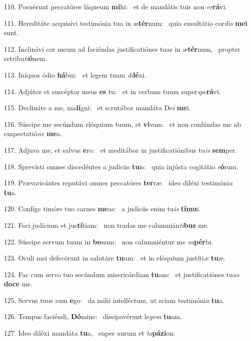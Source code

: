 110. Posuérunt peccatóres láqueum \textbf{mi}hi: \ast\  et de mandátis tuis non \textit{er}\textbf{rá}vi.\

111. Hereditáte acquisívi testimónia tua in æ\textbf{tér}num: \ast\  quia exsultátio cor\textit{dis} \textbf{me}\textbf{i} sunt.\

112. Inclinávi cor meum ad faciéndas justificatiónes tuas in æ\textbf{tér}num, \ast\  propter retribu\textit{ti}\textbf{ó}nem.\

113. Iníquos ódio \textbf{há}bui: \ast\  et legem tuam \textit{di}\textbf{lé}xi.\

114. Adjútor et suscéptor meus \textbf{es} tu: \ast\  et in verbum tuum super\textit{spe}\textbf{rá}vi.\

115. Declináte a me, ma\textbf{lí}gni: \ast\  et scrutábor mandáta De\textit{i} \textbf{me}i.\

116. Súscipe me secúndum elóquium tuum, et \textbf{vi}vam: \ast\  et non confúndas me ab exspectatió\textit{ne} \textbf{me}a.\

117. Adjuva me, et salvus \textbf{e}ro: \ast\  et meditábor in justificatiónibus tu\textit{is} \textbf{sem}per.\

118. Sprevísti omnes discedéntes a judíciis \textbf{tu}is: \ast\  quia injústa cogitátio \textit{e}\textbf{ó}rum.\

119. Prævaricántes reputávi omnes peccatóres \textbf{ter}ræ: \ast\  ídeo diléxi testimóni\textit{a} \textbf{tu}a.\

120. Confíge timóre tuo carnes \textbf{me}as: \ast\  a judíciis enim tu\textit{is} \textbf{tí}\textbf{mu}i.\

121. Feci judícium et jus\textbf{tí}tiam: \ast\  non tradas me calumnián\textit{ti}\textbf{bus} me.\

122. Súscipe servum tuum in \textbf{bo}num: \ast\  non calumniéntur me \textit{su}\textbf{pér}bi.\

123. Oculi mei defecérunt in salutáre \textbf{tu}um: \ast\  et in elóquium justíti\textit{æ} \textbf{tu}æ.\

124. Fac cum servo tuo secúndum misericórdiam \textbf{tu}am: \ast\  et justificatiónes tu\textit{as} \textbf{do}\textbf{ce} me.\

125. Servus tuus sum \textbf{e}go: \ast\  da mihi intelléctum, ut sciam testimóni\textit{a} \textbf{tu}a.\

126. Tempus faciéndi, \textbf{Dó}mine: \ast\  dissipavérunt le\textit{gem} \textbf{tu}am.\

127. Ideo diléxi mandáta \textbf{tu}a, \ast\  super aurum et \textit{to}\textbf{pá}\textbf{zi}on.\

